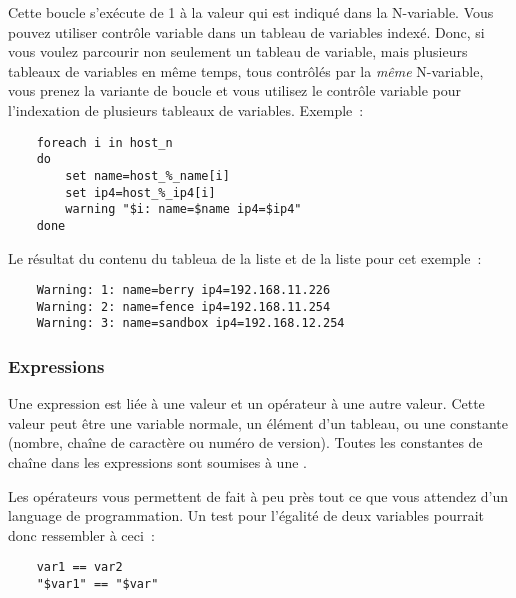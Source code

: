 \begin{enumerate}
    Cette boucle s'exécute de 1 à la valeur qui est indiqué dans la N-variable.
	Vous pouvez utiliser contrôle variable dans un tableau de variables indexé.
	Donc, si vous voulez parcourir non seulement un tableau de variable, mais
	plusieurs tableaux de variables en même temps, tous contrôlés par la \emph{même}
	N-variable, vous prenez la variante de boucle et vous utilisez le contrôle variable
	pour l'indexation de plusieurs tableaux de variables. Exemple~:

\begin{example}
\begin{verbatim}
    foreach i in host_n
    do
        set name=host_%_name[i]
        set ip4=host_%_ip4[i]
        warning "$i: name=$name ip4=$ip4"
    done
\end{verbatim}
\end{example}

    Le résultat du contenu du tableua de la liste  et de la liste
	 pour cet exemple~:

\begin{example}
\begin{verbatim}
    Warning: 1: name=berry ip4=192.168.11.226
    Warning: 2: name=fence ip4=192.168.11.254
    Warning: 3: name=sandbox ip4=192.168.12.254
\end{verbatim}
\end{example}

    \end{enumerate}


    \subsubsection{Expressions}

    Une expression est liée à une valeur et un opérateur à une autre valeur.
	Cette valeur peut être une variable normale, un élément d'un tableau, ou une
	constante (nombre, chaîne de caractère ou numéro de version). Toutes les constantes
	de chaîne dans les expressions sont soumises à une
	.

    Les opérateurs vous permettent de fait à peu près tout ce que vous
    attendez d'un language de programmation. Un test pour l'égalité de deux
    variables pourrait donc ressembler à ceci~:

\begin{example}
\begin{verbatim}
    var1 == var2
    "$var1" == "$var"
\end{verbatim}
\end{example}

